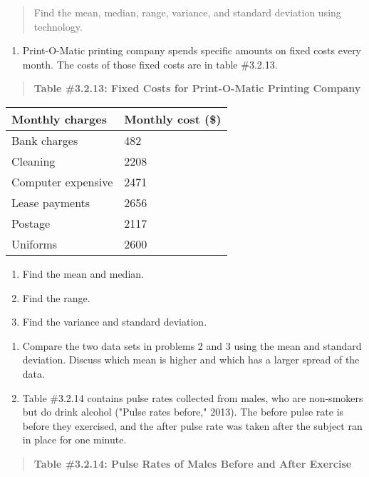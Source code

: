 \documentclass[]{book}
\providecommand{\tightlist}{%
  \setlength{\itemsep}{0pt}\setlength{\parskip}{0pt}}
\begin{document}
\begin{quote}
Find the mean, median, range, variance, and standard deviation using
technology.
\end{quote}

\begin{enumerate}
\def\labelenumi{\arabic{enumi}.}
\setcounter{enumi}{5}
\tightlist
\item
  Print-O-Matic printing company spends specific amounts on fixed
  costs every month. The costs of those fixed costs are in table
  \#3.2.13.
\end{enumerate}

\begin{quote}
\textbf{Table \#3.2.13: Fixed Costs for Print-O-Matic Printing Company}
\end{quote}

\begin{longtable}[]{@{}ll@{}}
\toprule
Monthly charges & Monthly cost (\$)\tabularnewline
\midrule
\endhead
Bank charges & 482\tabularnewline
Cleaning & 2208\tabularnewline
Computer expensive & 2471\tabularnewline
Lease payments & 2656\tabularnewline
Postage & 2117\tabularnewline
Uniforms & 2600\tabularnewline
\bottomrule
\end{longtable}

\begin{enumerate}
\def\labelenumi{\alph{enumi}.}
\item
  Find the mean and median.
\item
  Find the range.
\item
  Find the variance and standard deviation.
\end{enumerate}

\begin{enumerate}
\def\labelenumi{\arabic{enumi}.}
\setcounter{enumi}{6}
\item
  Compare the two data sets in problems 2 and 3 using the mean and
  standard deviation. Discuss which mean is higher and which has a
  larger spread of the data.
\item
  Table \#3.2.14 contains pulse rates collected from males, who are
  non-smokers but do drink alcohol ("Pulse rates before," 2013). The
  before pulse rate is before they exercised, and the after pulse rate
  was taken after the subject ran in place for one minute.
\end{enumerate}

\begin{quote}
\textbf{Table \#3.2.14: Pulse Rates of Males Before and After Exercise}
\end{quote}
\end{document}
